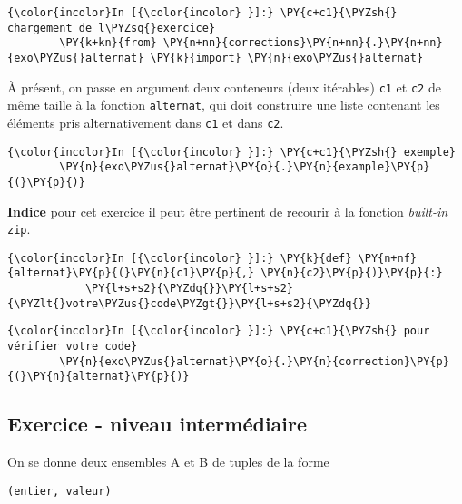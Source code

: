     \begin{Verbatim}[commandchars=\\\{\}]
{\color{incolor}In [{\color{incolor} }]:} \PY{c+c1}{\PYZsh{} chargement de l\PYZsq{}exercice}
        \PY{k+kn}{from} \PY{n+nn}{corrections}\PY{n+nn}{.}\PY{n+nn}{exo\PYZus{}alternat} \PY{k}{import} \PY{n}{exo\PYZus{}alternat}
\end{Verbatim}


    À présent, on passe en argument deux conteneurs (deux itérables)
\texttt{c1} et \texttt{c2} de même taille à la fonction
\texttt{alternat}, qui doit construire une liste contenant les éléments
pris alternativement dans \texttt{c1} et dans \texttt{c2}.

    \begin{Verbatim}[commandchars=\\\{\}]
{\color{incolor}In [{\color{incolor} }]:} \PY{c+c1}{\PYZsh{} exemple}
        \PY{n}{exo\PYZus{}alternat}\PY{o}{.}\PY{n}{example}\PY{p}{(}\PY{p}{)}
\end{Verbatim}


    \textbf{Indice} pour cet exercice il peut être pertinent de recourir à
la fonction \emph{built-in} \texttt{zip}.

    \begin{Verbatim}[commandchars=\\\{\}]
{\color{incolor}In [{\color{incolor} }]:} \PY{k}{def} \PY{n+nf}{alternat}\PY{p}{(}\PY{n}{c1}\PY{p}{,} \PY{n}{c2}\PY{p}{)}\PY{p}{:}
            \PY{l+s+s2}{\PYZdq{}}\PY{l+s+s2}{\PYZlt{}votre\PYZus{}code\PYZgt{}}\PY{l+s+s2}{\PYZdq{}}
\end{Verbatim}


    \begin{Verbatim}[commandchars=\\\{\}]
{\color{incolor}In [{\color{incolor} }]:} \PY{c+c1}{\PYZsh{} pour vérifier votre code}
        \PY{n}{exo\PYZus{}alternat}\PY{o}{.}\PY{n}{correction}\PY{p}{(}\PY{n}{alternat}\PY{p}{)}
\end{Verbatim}


    \hypertarget{exercice---niveau-intermuxe9diaire}{%
\subsection{Exercice - niveau
intermédiaire}\label{exercice---niveau-intermuxe9diaire}}

    On se donne deux ensembles A et B de tuples de la forme

\begin{verbatim}
(entier, valeur)
\end{verbatim}

